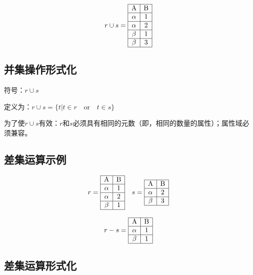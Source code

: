 \[
r\cup s = \begin{array}{|c|c|}
    \hline
    \mathrm{A} & \mathrm{B} \\ \hline
    \alpha & 1 \\ \hline
    \alpha & 2 \\ \hline
    \beta & 1 \\ \hline
    \beta & 3 \\ \hline
\end{array}
\]

\subsection{并集操作形式化}

符号：$r\cup s$

定义为：$r\cup s= \{t|t\in r\quad \text{or} \quad t\in s\}$

为了使$r\cup s$有效：$r$和$s$必须具有相同的元数（即，相同的数量的属性）；属性域必须兼容。

\subsection{差集运算示例}

\[
r=\begin{array}{|c|c|}
    \hline
    \mathrm{A} & \mathrm{B} \\ \hline
    \alpha & 1 \\ \hline
    \alpha & 2 \\ \hline
    \beta & 1\\ \hline
\end{array}
\quad
s=\begin{array}{|c|c|}
    \hline
    \mathrm{A} & \mathrm{B} \\ \hline
    \alpha & 2\\ \hline
    \beta & 3\\ \hline
\end{array}
\]

\[
r-s=\begin{array}{|c|c|}
    \hline
    \mathrm{A} & \mathrm{B}\\ \hline
    \alpha & 1\\ \hline
    \beta & 1 \\ \hline
\end{array}
\]

\subsection{差集运算形式化}

